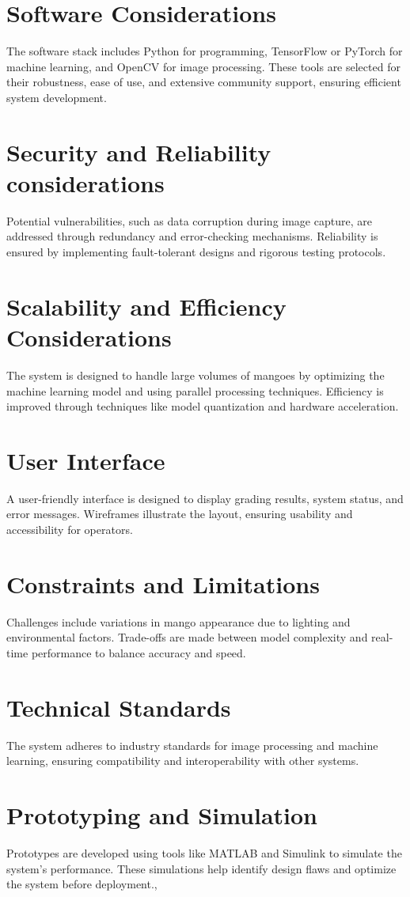 \section{Software Considerations}
The software stack includes Python for programming, TensorFlow or PyTorch for machine learning, and OpenCV for image processing. These tools are selected for their robustness, ease of use, and extensive community support, ensuring efficient system development.
\section{Security and Reliability considerations}
Potential vulnerabilities, such as data corruption during image capture, are addressed through redundancy and error-checking mechanisms. Reliability is ensured by implementing fault-tolerant designs and rigorous testing protocols.
\section{Scalability and Efficiency Considerations}
The system is designed to handle large volumes of mangoes by optimizing the machine learning model and using parallel processing techniques. Efficiency is improved through techniques like model quantization and hardware acceleration.
\section{User Interface}
A user-friendly interface is designed to display grading results, system status, and error messages. Wireframes illustrate the layout, ensuring usability and accessibility for operators.
\section{Constraints and Limitations}
Challenges include variations in mango appearance due to lighting and environmental factors. Trade-offs are made between model complexity and real-time performance to balance accuracy and speed.
\section{Technical Standards}
The system adheres to industry standards for image processing and machine learning, ensuring compatibility and interoperability with other systems.
\section{Prototyping and Simulation}
Prototypes are developed using tools like MATLAB and Simulink to simulate the system’s performance. These simulations help identify design flaws and optimize the system before deployment.,
